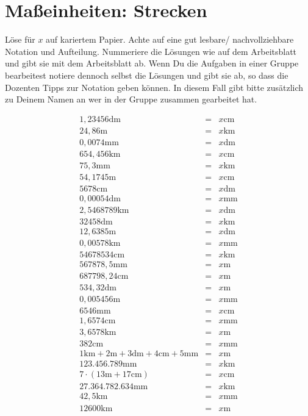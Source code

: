 \documentclass[a4paper]{book}%
\newcommand{\anweisungArbeitsblatt}{Löse für $x$ auf kariertem Papier. Achte auf eine gut lesbare/ nachvollziehbare Notation und Aufteilung. Nummeriere die Lösungen wie auf dem Arbeitsblatt und gibt sie mit dem Arbeitsblatt ab. Wenn Du die Aufgaben in einer Gruppe bearbeitest notiere dennoch selbst die Lösungen und gibt sie ab, so dass die Dozenten Tipps zur Notation geben können. In diesem Fall gibt bitte zusätzlich zu Deinem Namen an wer in der Gruppe zusammen gearbeitet hat.}
\theoremstyle{definition}
\begin{document}
\newpage
\section{Maßeinheiten: Strecken}

\anweisungArbeitsblatt

\begin{eqnarray}
  1,23456\text{dm} &=& x \text{cm}\\
  24,86\text{m} &=& x \text{km}\\
  0,0074\text{mm} &=& x \text{dm}\\
  654,456\text{km} &=& x \text{cm}\\
  75,3\text{mm} &=& x \text{km}\\
  54,1745\text{m} &=& x \text{cm}\\
  5678\text{cm} &=& x \text{dm}\\
  0,00054\text{dm} &=& x \text{mm}\\
  2,5468789\text{km} &=& x \text{dm}\\
  32458\text{dm} &=& x \text{km}\\
  12,6385\text{m} &=& x \text{dm}\\
  0,00578\text{km} &=& x \text{mm}\\
  54678534\text{cm} &=& x \text{km}\\
  567878,5\text{mm} &=& x \text{m}\\
  687798,24\text{cm} &=& x \text{m}\\
  534,32\text{dm} &=& x \text{m}\\
  0,005456\text{m} &=& x \text{mm}\\
  6546\text{mm} &=& x \text{cm}\\
  1,6574\text{cm} &=& x \text{mm}\\
  3,6578\text{km} &=& x \text{m}\\
  382\text{cm} &=& x \text{mm}\\
  1\text{km} + 2\text{m} +3\text{dm} +4\text{cm} +5\text{mm} &=& x \text{m} \\
  123.456.789\text{mm} &=& x \text{km} \\
  7 \cdot (13\text{m} + 17\text{cm}) &=& x\text{cm} \\
  27.364.782.634\text{mm} &=& x \text{km}\\
  42,5\text{km} &=& x \text{mm}\\
  12600\text{km} &=& x \text{m}
\end{eqnarray}
\end{document}
